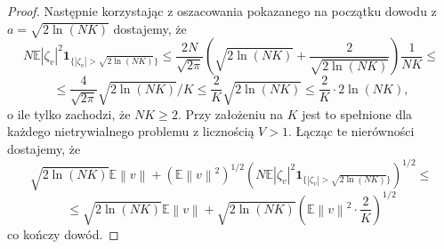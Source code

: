 \documentclass{article}
\newcommand{\norm}[1]{\left\lVert#1\right\rVert}
\begin{document}
\begin{proof}
Następnie korzystając z oszacowania pokazanego na początku dowodu z $a=\sqrt{2\ln (NK)}$ dostajemy, że
\begin{displaymath}
N\mathbb{E}|\zeta_v|^2\pmb{1}_{\{|\zeta_v|> \sqrt{2\ln (NK)}\}}\leq \frac{2N}{\sqrt{2\pi}}\left(\sqrt{2\ln (NK)}+\frac{2}{\sqrt{2\ln (NK)}}\right)\frac{1}{NK}\leq
\end{displaymath}
\begin{displaymath}
\leq  \frac{4}{\sqrt{2\pi}}\sqrt{2\ln (NK)}/K\leq \frac{2}{K}\sqrt{2\ln (NK)}\leq  \frac{2}{K}\cdot 2\ln (NK),
\end{displaymath}
o ile tylko zachodzi, że $NK\geq 2$. Przy założeniu na $K$ jest to spełnione dla każdego nietrywialnego problemu z licznością $V>1$. Łącząc te nierówności dostajemy, że
\begin{displaymath}
\sqrt{2\ln (NK)}\mathbb{E}\norm{v}+\left(\mathbb{E}\norm{v}^2\right)^{1/2}\left(N\mathbb{E}|\zeta_v|^2\pmb{1}_{\{|\zeta_v|> \sqrt{2\ln (NK)}\}}\right)^{1/2}\leq
\end{displaymath}
\begin{displaymath}
\leq \sqrt{2\ln (NK)}\mathbb{E}\norm{v}+\sqrt{2\ln (NK)}\left(\mathbb{E}\norm{v}^2\cdot \frac{2}{K}\right)^{1/2}
\end{displaymath}
co kończy dowód.
\end{proof}
\end{document}
